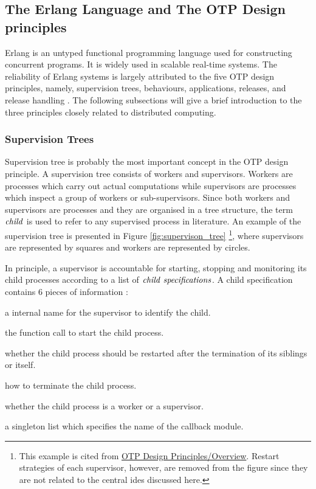 \subsection{The Erlang Language and The OTP Design principles }
\label{sec:Erlang}
Erlang \cite{Erlang} is an untyped functional programming language used for constructing concurrent programs.  It is widely used in scalable real-time systems.  The reliability of Erlang systems is largely attributed to the five OTP design principles, namely, supervision trees, behaviours, applications, releases, and release handling \cite{OTP}.  The following subsections will give a brief introduction to the three principles closely related to distributed computing.

\subsubsection{Supervision Trees}
\label{subsec:supervisiontree}

Supervision tree is probably the most important concept in the OTP design principle.  A supervision tree consists of workers and supervisors.  Workers are processes which carry out actual computations while supervisors are processes which inspect a group of workers or sub-supervisors.  Since both workers and supervisors are processes and they are organised in a tree structure, the term $\it{child}$ is used to refer to any supervised process in literature.  An example of the supervision tree is presented in Figure \ref{fig:supervison_tree} \footnote{This example is cited from \href{http://www.erlang.org/doc/design_principles/des_princ.html}{OTP Design Principles/Overview}.  Restart strategies of each supervisor, however, are removed from the figure since they are not related to the central ides discussed here.}, where supervisors are represented by squares and workers are represented by circles.

In principle, a supervisor is accountable for starting, stopping and monitoring its child processes according to a list of $\it{child \ specifications}$.  A child specification contains 6 pieces of information \cite{OTP}: 
\begin{inparaenum} [i)]
  \item a internal name for the supervisor to identify the child. 
  \item the function call to start the child process.
  \item whether the child process should be restarted after the termination of its siblings or itself.
  \item how to terminate the child process.
  \item whether the child process is a worker or a supervisor.
  \item a singleton list which specifies the name of the callback module. 
\end{inparaenum}

